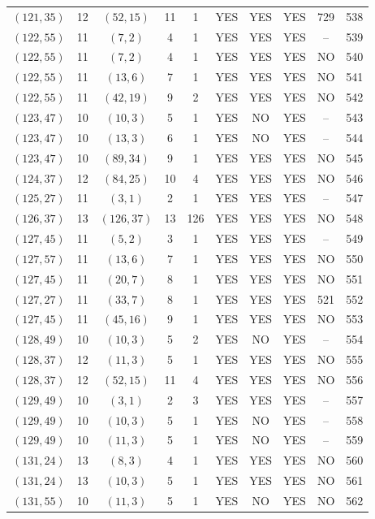 \begin{longtable}{|c|c|c|c|c|c|c|c|c|c|}
$(121, 35)$ & 12 & $(52, 15)$ & 11 & 1 & YES & YES & YES & 729 & 538\\
$(122, 55)$ & 11 & $(7, 2)$ & 4 & 1 & YES & YES & YES & -- & 539\\
$(122, 55)$ & 11 & $(7, 2)$ & 4 & 1 & YES & YES & YES & NO & 540\\
$(122, 55)$ & 11 & $(13, 6)$ & 7 & 1 & YES & YES & YES & NO & 541\\
$(122, 55)$ & 11 & $(42, 19)$ & 9 & 2 & YES & YES & YES & NO & 542\\
$(123, 47)$ & 10 & $(10, 3)$ & 5 & 1 & YES & NO & YES & -- & 543\\
$(123, 47)$ & 10 & $(13, 3)$ & 6 & 1 & YES & NO & YES & -- & 544\\
$(123, 47)$ & 10 & $(89, 34)$ & 9 & 1 & YES & YES & YES & NO & 545\\
$(124, 37)$ & 12 & $(84, 25)$ & 10 & 4 & YES & YES & YES & NO & 546\\
$(125, 27)$ & 11 & $(3, 1)$ & 2 & 1 & YES & YES & YES & -- & 547\\
$(126, 37)$ & 13 & $(126, 37)$ & 13 & 126 & YES & YES & YES & NO & 548\\
$(127, 45)$ & 11 & $(5, 2)$ & 3 & 1 & YES & YES & YES & -- & 549\\
$(127, 57)$ & 11 & $(13, 6)$ & 7 & 1 & YES & YES & YES & NO & 550\\
$(127, 45)$ & 11 & $(20, 7)$ & 8 & 1 & YES & YES & YES & NO & 551\\
$(127, 27)$ & 11 & $(33, 7)$ & 8 & 1 & YES & YES & YES & 521 & 552\\
$(127, 45)$ & 11 & $(45, 16)$ & 9 & 1 & YES & YES & YES & NO & 553\\
$(128, 49)$ & 10 & $(10, 3)$ & 5 & 2 & YES & NO & YES & -- & 554\\
$(128, 37)$ & 12 & $(11, 3)$ & 5 & 1 & YES & YES & YES & NO & 555\\
$(128, 37)$ & 12 & $(52, 15)$ & 11 & 4 & YES & YES & YES & NO & 556\\
$(129, 49)$ & 10 & $(3, 1)$ & 2 & 3 & YES & YES & YES & -- & 557\\
$(129, 49)$ & 10 & $(10, 3)$ & 5 & 1 & YES & NO & YES & -- & 558\\
$(129, 49)$ & 10 & $(11, 3)$ & 5 & 1 & YES & NO & YES & -- & 559\\
$(131, 24)$ & 13 & $(8, 3)$ & 4 & 1 & YES & YES & YES & NO & 560\\
$(131, 24)$ & 13 & $(10, 3)$ & 5 & 1 & YES & YES & YES & NO & 561\\
$(131, 55)$ & 10 & $(11, 3)$ & 5 & 1 & YES & NO & YES & NO & 562\\

\end{longtable}
